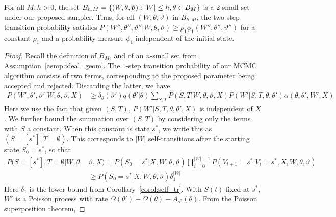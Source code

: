 \begin{lemma}
  For all $M,h > 0$, the set $B_{h,M} =
\left\lbrace (W, \theta, \vartheta) : |W| \leq h, \theta \in B_M
\right\rbrace$ is a 2-small set under our proposed sampler. 
Thus, for all $(W,\theta,\vartheta)$ {in $B_{h, M}$},
the two-step transition probability satisfies 
$P(W'', \theta'',\vartheta'' | W, \theta, \vartheta) \ge \rho_1 
\phi_1(W{''}, \theta'',\vartheta'') $ for a constant $\rho_1$ and a 
probability measure $\phi_1$ independent of the initial state.
\label{lem:small_set}
\end{lemma}
\begin{proof} Recall the definition of $B_M$, and of an $n$-small set from 
  Assumption~\ref{asmp:ideal_geom}. The $1$-step transition probability of our MCMC algorithm
  consists of two terms, corresponding to the proposed parameter being
  accepted and rejected. Discarding the latter, we have %
\begin{align*}
  P(W',\theta',\vartheta'|W,\theta,\vartheta,X)&\geq
  \delta_\theta(\vartheta') q(\theta'|\theta)
 \sum_{S,T}  P(S,T | W, \theta, \vartheta, X) 
             P(W'| S, T, \theta, \theta')
             \alpha(\theta, \theta', W';X)
\end{align*}
Here we use the fact that given $(S,T)$,
$P(W'|S,T,\theta,\theta',X)$ is independent of  $X$.
We further bound the summation over $(S,T)$ by considering only the terms
with $S$ a constant. When this constant is  state $s^*$, we write this as 
$(S=[s^*], T= \emptyset)$. This corresponds to $|W|$ self-transitions 
after the starting state $S_0=s^*$, so that
\vspace{-.1in}
\begin{align*}
  P(S=[s^*], T = \emptyset | W, \theta, &\vartheta, X) =
P(S_0=s^*|X,W, \theta, \vartheta)\prod_{i = 0}^{|W| - 1} 
P(V_{i + 1} = s^* | V_i = s^*,X,W,\theta,\vartheta) \\ 
& \geq P(S_0=s^*|X,W, \theta, \vartheta)\delta_1^{|W|} %
\end{align*}
Here $\delta_1$ is the lower bound from Corollary~\ref{corol:self_tr}.
With $S(t)$ fixed at $s^*$, $W'$ is a Poisson process with rate
$\Omega(\theta') + \Omega(\theta) - A_{s^*}(\theta)$.
From the %
Poisson superposition theorem,

\end{proof}
